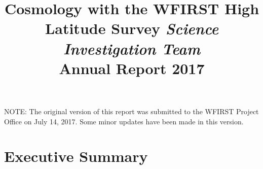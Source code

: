 \documentclass[letter]{ar-1col_WFIRST-HLS}
\begin{document}

\thispagestyle{empty}


\cleardoublepage



\title{Cosmology with the WFIRST High Latitude Survey \emph{Science Investigation Team}\\
Annual Report 2017}



\maketitle

\newpage

\vspace*{\fill}
\begin{center}
\small{NOTE: The original version of this report was submitted to the WFIRST Project Office on July 14, 2017. Some minor updates have been made in this version.}
\end{center}
\vspace*{\fill}

\newpage

\tableofcontents
\thispagestyle{empty}

\newpage
{}

\section{Executive Summary}
\label{sec:executive_summary}

\end{document}
